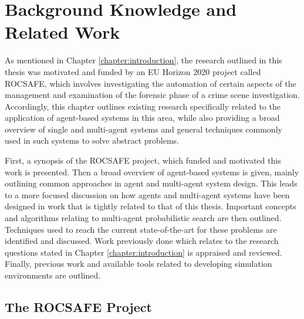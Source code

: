 

\chapter{Background Knowledge and Related Work}\label{chapter:Background}

\workinprogress
As mentioned in Chapter \ref{chapter:introduction}, the research outlined in this thesis was motivated and funded by an EU Horizon 2020 project called ROCSAFE, which involves investigating the automation of certain aspects of the management and examination of the forensic phase of a crime scene investigation. Accordingly, this chapter outlines existing research specifically related to the application of agent-based systems in this area, while also providing a broad overview of single and multi-agent systems and general techniques commonly used in such systems to solve abstract problems. \par
First, a synopsis of the ROCSAFE project, which funded and motivated this work is presented. Then a broad overview of agent-based systems is given, mainly outlining common approaches in agent and multi-agent system design. This leads to a more focused discussion on how agents and multi-agent systems have been designed in work that is tightly related to that of this thesis. Important concepts and algorithms relating to multi-agent probabilistic search are then outlined. Techniques used to reach the current state-of-the-art for these problems are identified and discussed. Work previously done 
which relates to the research questions stated in Chapter \ref{chapter:introduction} is appraised and reviewed. Finally, previous work and available tools related to developing simulation environments are outlined.

\section{The ROCSAFE Project}\label{sec:ROCSAFEBG}


